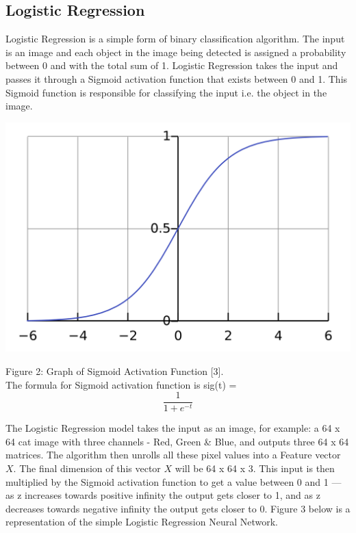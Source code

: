 \documentclass[conference]{IEEEtran}
\begin{document}
\subsection{\textbf{Logistic Regression}}
Logistic Regression is a simple form of binary classification algorithm. The input is an image and each object in the image being detected is assigned a probability between 0 and with the total sum of 1. Logistic Regression takes the input and passes it through a Sigmoid activation function that exists between 0 and 1. This Sigmoid function is responsible for classifying the input i.e. the object in the image.
\begin{center}
    \includegraphics[scale=0.1]{1920px-Logistic-curve.svg.png}\\
\end{center}
Figure 2: Graph of Sigmoid Activation Function [3].\\

The formula for Sigmoid activation function is sig(t) =
\[\frac{1}{1+e^{-t}}\]

The Logistic Regression model takes the input as an image, for example: a 64 x 64 cat image with three channels - Red, Green & Blue, and outputs three 64 x 64 matrices. The algorithm then unrolls all these pixel values into a Feature vector $X$. The final dimension of this vector $X$ will be 64 x 64 x 3. This input is then multiplied by the Sigmoid activation function to get a value between 0 and 1 — as z increases towards positive infinity the output gets closer to 1, and as z decreases towards negative infinity the output gets closer to 0. Figure 3 below is a representation of the simple Logistic Regression Neural Network.
\end{document}

